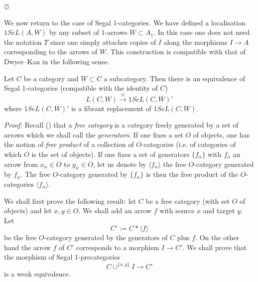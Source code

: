 \noindent
$\oslash$

We now return to the case of Segal $1$-categories. We have defined a
localisation $1SeL(A,W)$ by any subset of $1$-arrows $W\subset A_1$.
In this case one does not need the notation $\Upsilon$ since one simply
attaches
copies of $\overline{I}$ along the morphisms $I\rightarrow A$
corresponding to the arrows of $W$. This construction is compatible
with
that of Dwyer--Kan in the following sense.

\begin{proposition}
\label{dklocsegloc}
Let $C$ be a category and $W\subset C$ a subcategory.
Then there is an
equivalence of Segal $1$-categories (compatible with
the identity of
$C$)
$$
L(C,W) \stackrel{\cong}{\rightarrow} 1SeL(C,W)'
$$
where $1SeL(C,W)'$ is a fibrant replacement of
$1SeL(C,W)$.
\end{proposition}
{\em Proof:}
Recall (\cite{DwyerKan1}) that a {\em free category} is a category
freely generated by a set of arrows which we shall call the {\em
generators}. If one fixes a set $O$ of objects, one has the notion of {\em
free product} of a collection of $O$-categories
(i.e. of categories of which $O$ is
the set of objects). If one fixes a set of generators $\{
f_{\alpha}\}$ with $f_{\alpha}$ an arrow from $x_{\alpha}\in O$ to
$y_{\alpha}\in O$, let us denote by $\langle f_{\alpha}\rangle$ the free
$O$-category generated by $f_{\alpha}$. The free $O$-category generated by
$\{ f_{\alpha}\}$ is then the free product of the $O$-categories
$\langle f_{\alpha}\rangle$.

We shall first prove the following result: let $C$ be a free category
(with set $O$ of objects) and
let $x,y\in O$. We shall add an arrow $f$ with source
$x$ and target $y$. Let
$$
C':= C\ast \langle f\rangle
$$
be the free $O$-category generated by the generators of $C$ plus $f$.
On the other hand the arrow $f$ of $C'$ corresponds to a morphism
$I\rightarrow C'$. We shall prove that the morphism of Segal $1$-precategories
$$
C\cup ^{\{ x,y\} }I\rightarrow C'
$$
is a weak equivalence.

